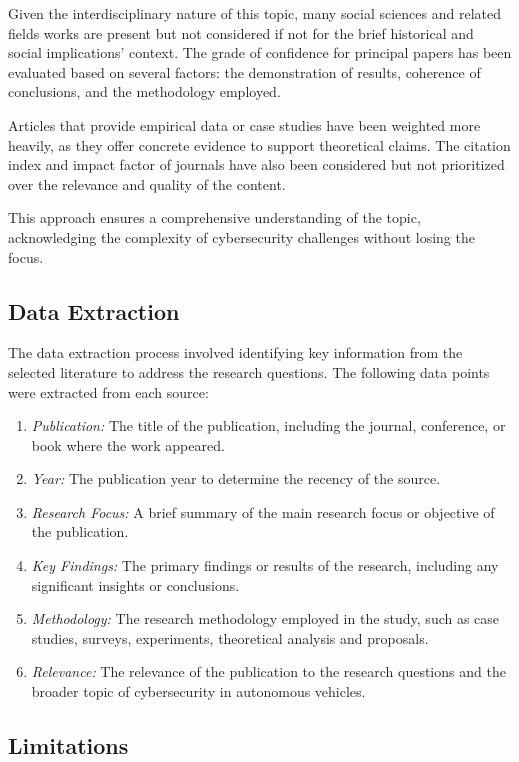 Given the interdisciplinary nature of this topic, many social sciences and related fields works are present but not considered if not for the brief historical and social implications' context.
The grade of confidence for principal papers has been evaluated based on several factors:
the demonstration of results, coherence of conclusions, and the methodology employed.

Articles that provide empirical data or case studies have been weighted more heavily, as they offer concrete evidence to support theoretical claims.
The citation index and impact factor of journals have also been considered but not prioritized over the relevance and quality of the content.

This approach ensures a comprehensive understanding of the topic, acknowledging the complexity of cybersecurity challenges without losing the focus.

\subsection{Data Extraction}\label{subsec:data-extraction}

The data extraction process involved identifying key information from the selected literature to address the research questions.
The following data points were extracted from each source:
\begin{enumerate}
    \item \textit{Publication:} The title of the publication, including the journal, conference, or book where the work appeared.
    \item \textit{Year:} The publication year to determine the recency of the source.
    \item \textit{Research Focus:} A brief summary of the main research focus or objective of the publication.
    \item \textit{Key Findings:} The primary findings or results of the research, including any significant insights or conclusions.
    \item \textit{Methodology:} The research methodology employed in the study, such as case studies, surveys, experiments, theoretical analysis and proposals.
    \item \textit{Relevance:} The relevance of the publication to the research questions and the broader topic of cybersecurity in autonomous vehicles.
\end{enumerate}

\subsection{Limitations}\label{subsec:limitations}

